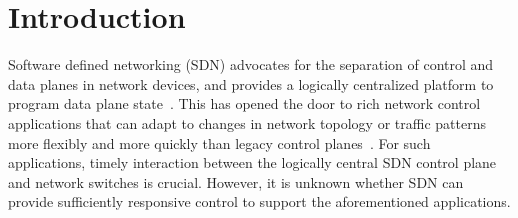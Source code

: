 \section{Introduction}\label{sec-intro}

Software defined networking (SDN) advocates for the separation of control and
data planes in network devices, and provides a logically centralized platform
to program data plane state~\cite{openflow}.  This has opened the
door to rich network control applications that can adapt to changes in
network topology or traffic patterns more flexibly and more quickly than 
legacy control
planes~\cite{microte,hedera}.
For such applications, timely interaction between the logically
central SDN control plane and network switches is crucial. 
However, it is unknown whether SDN can
provide sufficiently responsive control to support the aforementioned
applications.



